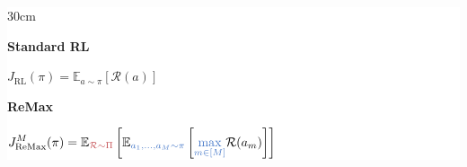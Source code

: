 \documentclass[border=0pt]{standalone}
\begin{document}
\setlength{\fboxsep}{10pt}
\colorbox{white}{%
\begin{varwidth}{30cm}

\noindent
{\Huge\bfseries Standard RL\strut}

\vspace{1.3em}

{\fontsize{28}{34}\selectfont
\noindent$
\displaystyle
J_{\mathrm{RL}}(\pi)
=
\mathbb{E}_{a\sim\pi}[\mathcal{R}(a)]
$
}

\vspace{2.8em}

{\Huge\bfseries ReMax\strut}

\vspace{0.2em}

{\fontsize{28}{34}\selectfont
\noindent$
\displaystyle
J_{\mathrm{ReMax}}^M(\pi)
=
\mathbb{E}_{\textcolor{softred}{\mathcal{R}\sim\Pi}}
\left[
\mathbb{E}_{\textcolor{softblue}{a_1,\ldots,a_M\sim\pi}}
\left[
\textcolor{softblue}{\max_{m\in[M]}} \mathcal{R}(a_m)
\right]
\right]
$
}

\end{varwidth}%
}
\end{document}
